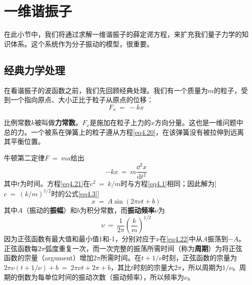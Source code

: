 \documentclass[12pt,a4paper,openany]{ctexbook}
\newcommand{\dd}[1]{\mathrm{d} #1}
\begin{document}
\section{一维谐振子}
\begin{flushleft}
    \setlength{\parindent}{2em}
在此小节中，我们将通过求解一维谐振子的薛定谔方程，来扩充我们量子力学的知识体系。这个系统作为分子振动的模型，很重要。
\end{flushleft}
\subsection{经典力学处理}
\begin{flushleft}
    \setlength{\parindent}{2em}
在看谐振子的波函数之前，我们先回顾经典处理。我们有一个质量为$m$的粒子，受到一个指向原点、大小正比于粒子从原点的位移：
\begin{equation}
    F_x\ =\ -kx \label{eq4.20}
\end{equation}

比例常数$k$被叫做\textbf{力常数}。$F_x$是施加在粒子上力的$x$方向分量。这也是一维问题中总的力。一个被系在弹簧上的粒子遵从方程\eqref{eq4.20}，在该弹簧没有被拉伸到远离其平衡位置。

牛顿第二定律$F\ =\ ma$给出
\begin{equation}
    -kx\ =\ m\frac{\dd^2x}{\dd t^2} \label{eq4.21}
\end{equation}
其中$t$为时间。方程\eqref{eq4.21}在$c^2\ =\ k/m$时与方程\eqref{eq4.1}相同；因此解为[$c\ =\ (k/m)^{1/2}$时的公式\eqref{eq4.3}]
\begin{equation}
    x\ =\ A\sin(2\pi \nu t+b) \label{eq4.22}
\end{equation}
其中$A$（振动的\textbf{振幅}）和$b$为积分常数，而\textbf{振动频率$\nu$}为
\begin{equation}
    \boxed{\nu\ =\ \frac{1}{2\pi}}(\frac{k}{m})^{1/2} \label{eq4.23}
\end{equation}
因为正弦函数有最大值和最小值1和-1，分别对应于$x$在\eqref{eq4.22}中从$A$振荡到$-A$。正弦函数每$2\pi$弧度重复一次，而一次完整的振荡所需时间（称为\textbf{周期}）为将正弦函数的宗量（argument）增加$2\pi$所需时间。在$t+1/\nu$时刻，正弦函数的宗量为$2\pi\nu(t+1/\nu)+b\ =\ 2\pi\nu t+2\pi+b$，其比$t$时刻的宗量大$2\pi$，所以周期为$1/\nu$。周期的倒数为每单位时间的振动次数（振动频率），所以频率为$\nu$。


\end{flushleft}
\end{document}
